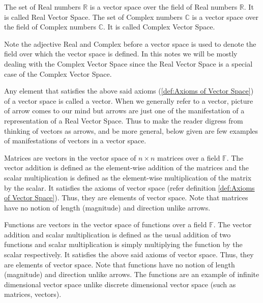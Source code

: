 \begin{example}
    The set of Real numbers $\mathbb{R}$ is a vector space over the field of Real numbers $\mathbb{R}$. It is called Real Vector Space.
    The set of Complex numbers $\mathbb{C}$ is a vector space over the field of Complex numbers $\mathbb{C}$. It is called Complex 
    Vector Space.
\end{example}
Note the adjective Real and Complex before a vector space is used to denote the field over which the vector space is defined.
In this notes we will be mostly dealing with the Complex Vector Space since the Real Vector Space is a special case of the Complex Vector Space.

Any element that satisfies the above said axioms (\ref{def:Axioms of Vector Space}) of a vector space is called a vector. When we generally refer to a vector, picture of arrow comes to our mind but
arrows are just one of the manifestation of a representation of a Real Vector Space. Thus to make the reader digress from thinking of vectors as arrows, and be more general, 
below given are few examples of manifestations of vectors in a vector space.

\begin{example}
    Matrices are vectors in the vector space of $n\times n$ matrices over a field $\mathbb{F}$. The vector addition is defined as the element-wise addition of the matrices and the scalar multiplication
    is defined as the element-wise multiplication of the matrix by the scalar. It satisfies the axioms of vector space (refer definition \ref{def:Axioms of Vector Space}).
    Thus, they are elements of vector space. Note that matrices have no notion of length (magnitude) and direction unlike arrows.
\end{example}

\begin{example}
    Functions are vectors in the vector space of functions over a field $\mathbb{F}$. The vector addition and scalar multiplication is defined as the usual addition of two functions
    and scalar multiplication is simply multiplying the function by the scalar respectively. It satisfies the above said axioms of vector space.
    Thus, they are elements of vector space. Note that functions have no notion of length (magnitude) and direction unlike arrows. The functions are an example of infinite 
    dimensional vector space unlike discrete dimensional vector space (such as matrices, vectors).
\end{example}

